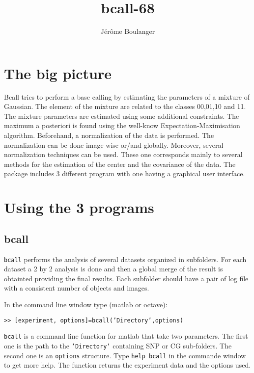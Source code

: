 \documentclass{scrartcl}
\title{bcall-68}
\author{J\'er\^ome Boulanger}
\begin{document}
\sf
\maketitle
\section{The big picture}
Bcall tries to perform a base calling by estimating the parameters of
a mixture of Gaussian. The element of the mixture are related to the
classes 00,01,10 and 11. The mixture parameters are estimated using
some additional constraints. The maximum a posteriori is found using
the well-know Expectation-Maximisation
algorithm\cite{em,em2}. Beforehand, a normalization of the data is
performed. The normalization can be done image-wise or/and
globally. Moreover, several normalization techniques can be
used. These one corresponds mainly to several methods for the
estimation of the center and the covariance of the data. The package
includes 3 different program with one having a graphical user
interface. 

\section{Using the 3 programs}

\subsection{bcall}

\texttt{bcall} performs the analysis of several datasets organized in
subfolders. For each dataset a 2 by 2 analysis is done and then a
global merge of the result is obtainted providing the final
results. Each subfolder should have a pair of log file with a
consistent number of objects and images.

In the command line window type (matlab or octave):

\texttt{>> [experiment, options]=bcall('Directory',options)}

\texttt{bcall} is a command line function for matlab that take two
parameters. The first one is the path to the \texttt{'Directory'}
containing SNP or CG sub-folders. The second one is an \texttt{options}
structure. Type \texttt{help bcall} in the commande window to get more
help. The function returns the experiment data and the options used.
\end{document}
